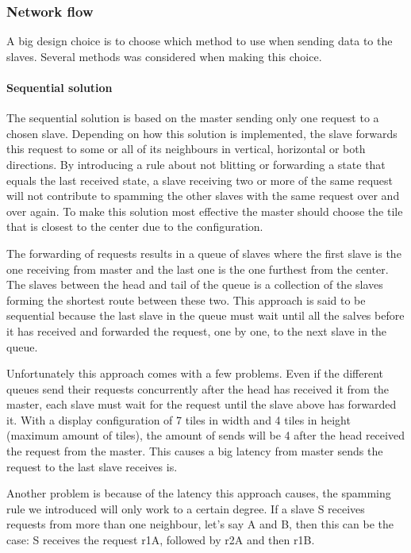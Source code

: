 \documentclass[12pt, a4paper, oneside]{article}
\begin{document}
\subsubsection{Network flow}
A big design choice is to choose which method to use when sending data to the slaves. Several methods was considered when making this choice. 

\paragraph{Sequential solution}
The sequential solution is based on the master sending only one request to a chosen slave. Depending on how this solution is implemented, the slave forwards this request to some or all of its neighbours in vertical, horizontal or both directions. By introducing a rule about not blitting or forwarding a state that equals the last received state, a slave receiving two or more of the same request will not contribute to spamming the other slaves with the same request over and over again. To make this solution most effective the master should choose the tile that is closest to the center due to the configuration.

The forwarding of requests results in a queue of slaves where the first slave is the one receiving from master and the last one is the one furthest from the center. The slaves between the head and tail of the queue is a collection of the slaves forming the shortest route between these two. 
This approach is said to be sequential because the last slave in the queue must wait until all the salves before it has received and forwarded the request, one by one, to the next slave in the queue.

Unfortunately this approach comes with a few problems. Even if the different queues send their requests concurrently after the head has received it from the master, each slave must wait for the request until the slave above has forwarded it. With a display configuration of 7 tiles in width and 4 tiles in height (maximum amount of tiles), the amount of sends will be 4 after the head received the request from the master. This causes a big latency from master sends the request to the last slave receives is. 

Another problem is because of the latency this approach causes, the spamming rule we introduced will only work to a certain degree. If a slave S receives requests from more than one neighbour, let's say A and B, then this can be the case:
S receives the request r1A, followed by r2A and then r1B.
\end{document}
